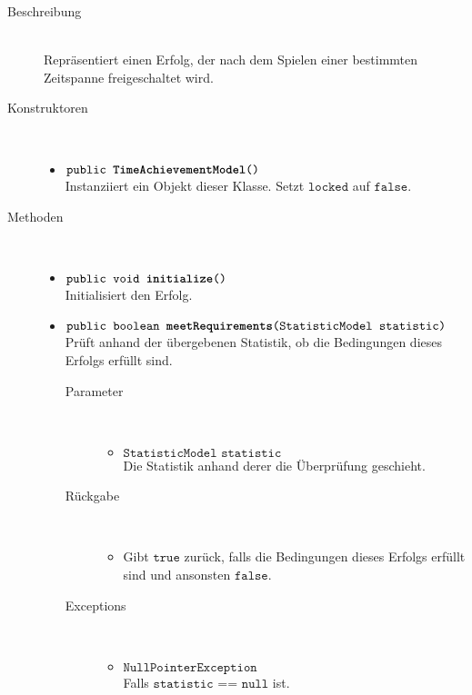 		\begin{description}
		\item[Beschreibung] \hfill \\ Repräsentiert einen Erfolg, der nach dem Spielen einer bestimmten Zeitspanne freigeschaltet wird.
			
		\item[Konstruktoren] \hfill \\
			\vspace{-.8cm}
			\begin{itemize}
				\item $\texttt{public \textbf{TimeAchievementModel}()}$ \\ Instanziiert ein Objekt dieser Klasse. Setzt $\texttt{locked}$ auf $\texttt{false}$.
			\end{itemize}
			
		\item[Methoden] \hfill \\
			\vspace{-.8cm}
			\begin{itemize}
				\item $\texttt{public void \textbf{initialize}()}$ \\ Initialisiert den Erfolg.
				
				\item $\texttt{public boolean \textbf{meetRequirements}(StatisticModel statistic)}$ \\ Prüft anhand der übergebenen Statistik, ob die Bedingungen dieses Erfolgs erfüllt sind.
				\begin{description}
				\item[Parameter] \hfill \\
					\vspace{-.8cm}
					\begin{itemize}
						\item $\texttt{StatisticModel statistic}$ \\ Die Statistik anhand derer die Überprüfung geschieht. 
					\end{itemize}
					\item[Rückgabe] \hfill \\
					\vspace{-.8cm}
					\begin{itemize}
						\item Gibt $\texttt{true}$ zurück, falls die Bedingungen dieses Erfolgs erfüllt sind und ansonsten $\texttt{false}$.
					\end{itemize}
					\item[Exceptions] \hfill \\
					\vspace{-.8cm}
					\begin{itemize}
						\item $\texttt{NullPointerException}$ \\ Falls $\texttt{statistic == null}$ ist.
					\end{itemize}
				\end{description}
			\end{itemize}
		\end{description}
		

